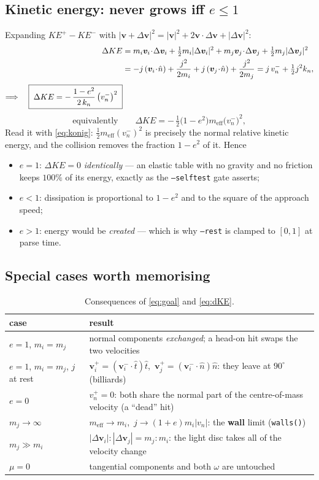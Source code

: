 \documentclass[a4paper,11pt]{article}
\newcommand{\vV}{\bm{v}}
\newcommand{\hh}{\hat{n}}
\newcommand{\ttt}{\hat{t}}
\begin{document}
\subsection{Kinetic energy: never grows iff $e\le1$}
Expanding $KE^{+}-KE^{-}$ with
$|\vV+\Delta\vV|^2=|\vV|^2+2\vV\cdot\Delta\vV+|\Delta\vV|^2$:
\begin{align}
  \Delta KE
  &= m_i\vV_i\!\cdot\!\Delta\vV_i+\tfrac12m_i|\Delta\vV_i|^2
   + m_j\vV_j\!\cdot\!\Delta\vV_j+\tfrac12m_j|\Delta\vV_j|^2 \notag\\
  &= -j\,(\vV_i\!\cdot\!\hh)+\frac{j^2}{2m_i}
   + j\,(\vV_j\!\cdot\!\hh)+\frac{j^2}{2m_j}
   = j\,v_n^{-}+\tfrac12 j^2 k_n , \notag\\[3pt]
  \Longrightarrow\quad
  \boxed{\;\Delta KE=-\,\frac{1-e^2}{2\,k_n}\,\bigl(v_n^{-}\bigr)^2\;}
  \label{eq:dKE}
\end{align}
\[
  \text{equivalently}\qquad
  \Delta KE=-\,\tfrac12\bigl(1-e^2\bigr)m_{\text{eff}}\bigl(v_n^{-}\bigr)^2 ,
\]
Read it with \eqref{eq:konig}: $\tfrac12 m_{\text{eff}}(v_n^-)^2$ is precisely
the normal relative kinetic energy, and the collision removes the fraction
$1-e^2$ of it. Hence
\begin{itemize}
\item $e=1$: $\Delta KE=0$ \emph{identically} --- an elastic table with no
  gravity and no friction keeps $100\%$ of its energy, exactly as the
  \texttt{--selftest} gate asserts;
\item $e<1$: dissipation is proportional to $1-e^2$ and to the square of the
  approach speed;
\item $e>1$: energy would be \emph{created} --- which is why \texttt{--rest} is
  clamped to $[0,1]$ at parse time.
\end{itemize}

\subsection{Special cases worth memorising}
\begin{table}[h]
\centering\footnotesize
\begin{tabular}{@{}ll@{}}
\toprule
case & result \\
\midrule
$e=1$, $m_i=m_j$ & normal components \emph{exchanged}; a head-on hit swaps the
  two velocities \\
$e=1$, $m_i=m_j$, $j$ at rest & $\vV_i^{+}=(\vV_i^{-}\!\cdot\ttt)\ttt$,\
  $\vV_j^{+}=(\vV_i^{-}\!\cdot\hh)\hh$: they leave at $90^\circ$ (billiards) \\
$e=0$ & $v_n^{+}=0$: both share the normal part of the centre-of-mass velocity
  (a ``dead'' hit) \\
$m_j\to\infty$ & $m_{\text{eff}}\to m_i$,\ $j\to(1+e)m_i|v_n|$: the \textbf{wall}
  limit (\texttt{walls()}) \\
$m_j\gg m_i$ & $|\Delta\vV_i|:|\Delta\vV_j|=m_j:m_i$: the light disc takes all
  of the velocity change \\
$\mu=0$ & tangential components and both $\omega$ are untouched \\
\bottomrule
\end{tabular}
\caption{Consequences of \eqref{eq:goal} and \eqref{eq:dKE}.}
\end{table}
\end{document}
